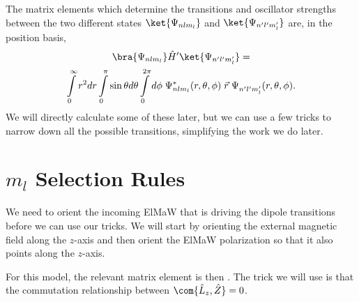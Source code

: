 The matrix elements which determine the transitions and oscillator strengths between the two different states $\ket{\Psi_{nlm_l}}$ and $\ket{\Psi_{n'l'm'_l}}$ are, in the position basis,
\begin{multline}
\bra{\Psi_{nlm_l}}\hat{H}'\ket{\Psi_{n'l'm'_l}} =\\ \int\displaylimits_0^\infty r^2 dr\int\displaylimits_0^\pi \sin\theta d\theta \int\displaylimits_0^{2\pi}d\phi\;\Psi^*_{nlm_l}(r,\theta,\phi) \;\vec{r}\; \Psi^{}_{n'l'm'_l}(r,\theta,\phi).
\label{eq:matrixintegral2}
\end{multline}
We will directly calculate some of these later, but we can use a few tricks to narrow down all the possible transitions, simplifying the work we do later.

\section{$m_l$ Selection Rules}
We need to orient the incoming ElMaW that is driving the dipole transitions before we can use our tricks. We will start by orienting the external magnetic field along the $z$-axis and then orient the ElMaW polarization so that it also points along the $z$-axis.
\begin{marginfigure}
\centering
{}
\end{marginfigure}%
For this model, the relevant matrix element is then
\beq
{}.
\eeq
The trick we will use is that the commutation relationship between $\com{\hat{L}_z,\hat{Z}}=0$. 

